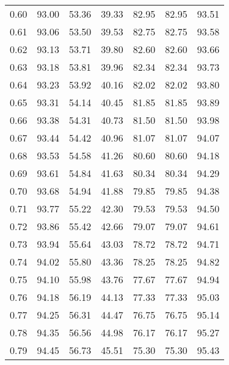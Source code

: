 \begin{tabular}{|c|c|c|c|c|c|c|}
      0.60 &     93.00 &     53.36 &      39.33 &   82.95 &      82.95 &         93.51 \\
      0.61 &     93.06 &     53.50 &      39.53 &   82.75 &      82.75 &         93.58 \\
      0.62 &     93.13 &     53.71 &      39.80 &   82.60 &      82.60 &         93.66 \\
      0.63 &     93.18 &     53.81 &      39.96 &   82.34 &      82.34 &         93.73 \\
      0.64 &     93.23 &     53.92 &      40.16 &   82.02 &      82.02 &         93.80 \\
      0.65 &     93.31 &     54.14 &      40.45 &   81.85 &      81.85 &         93.89 \\
      0.66 &     93.38 &     54.31 &      40.73 &   81.50 &      81.50 &         93.98 \\
      0.67 &     93.44 &     54.42 &      40.96 &   81.07 &      81.07 &         94.07 \\
      0.68 &     93.53 &     54.58 &      41.26 &   80.60 &      80.60 &         94.18 \\
      0.69 &     93.61 &     54.84 &      41.63 &   80.34 &      80.34 &         94.29 \\
      0.70 &     93.68 &     54.94 &      41.88 &   79.85 &      79.85 &         94.38 \\
      0.71 &     93.77 &     55.22 &      42.30 &   79.53 &      79.53 &         94.50 \\
      0.72 &     93.86 &     55.42 &      42.66 &   79.07 &      79.07 &         94.61 \\
      0.73 &     93.94 &     55.64 &      43.03 &   78.72 &      78.72 &         94.71 \\
      0.74 &     94.02 &     55.80 &      43.36 &   78.25 &      78.25 &         94.82 \\
      0.75 &     94.10 &     55.98 &      43.76 &   77.67 &      77.67 &         94.94 \\
      0.76 &     94.18 &     56.19 &      44.13 &   77.33 &      77.33 &         95.03 \\
      0.77 &     94.25 &     56.31 &      44.47 &   76.75 &      76.75 &         95.14 \\
      0.78 &     94.35 &     56.56 &      44.98 &   76.17 &      76.17 &         95.27 \\
      0.79 &     94.45 &     56.73 &      45.51 &   75.30 &      75.30 &         95.43 \\

\end{tabular}

